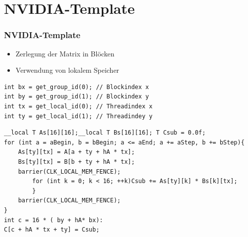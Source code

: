 \documentclass{beamer}
\begin{document}

\section{NVIDIA-Template}
\begin{frame}[fragile]
\frametitle{NVIDIA-Template}

\begin{itemize}
\item
Zerlegung der Matrix in Bl\"ocken
\item
Verwendung von lokalem Speicher 
\end{itemize}

\begin{lstlisting}[style=customc,caption=NVIDIA-Snippet]
int bx = get_group_id(0); // Blockindex x
int by = get_group_id(1); // Blockindex y
int tx = get_local_id(0); // Threadindex x
int ty = get_local_id(1); // Threadindey y
\end{lstlisting}



\end{frame}


\begin{frame}[fragile]
\begin{lstlisting}[style=customc,caption=NVIDIA-Snippet(2)]
__local T As[16][16];__local T Bs[16][16]; T Csub = 0.0f;
for (int a = aBegin, b = bBegin; a <= aEnd; a += aStep, b += bStep){ 
	As[ty][tx] = A[a + ty + hA * tx];
	Bs[ty][tx] = B[b + ty + hA * tx];
	barrier(CLK_LOCAL_MEM_FENCE);
		for (int k = 0; k < 16; ++k)Csub += As[ty][k] * Bs[k][tx];
		}
    barrier(CLK_LOCAL_MEM_FENCE);
}
int c = 16 * ( by + hA* bx):
C[c + hA * tx + ty] = Csub;
\end{lstlisting}


\end{frame}
\end{document}
